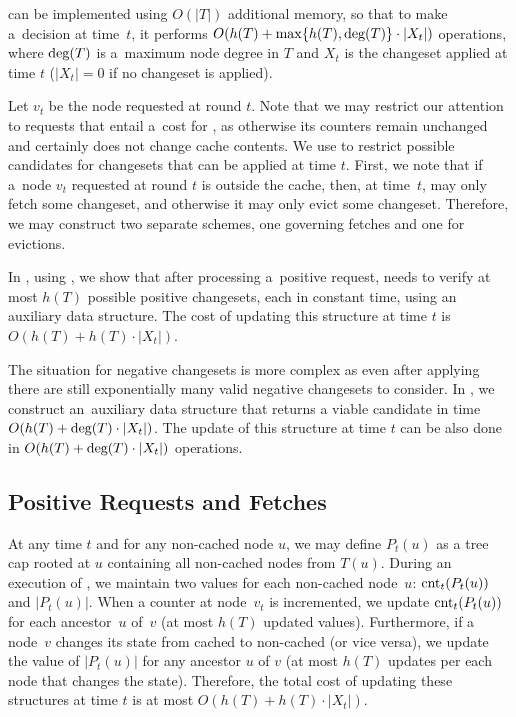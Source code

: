 \begin{theorem}
\ALGTC can be implemented using $O(|T|)$ additional memory, so that to make a~decision at time~$t$, it performs $O(h(T) + \max \{ h(T), \textrm{deg}(T) \} \cdot |X_t|)$ operations,
where $\textrm{deg}(T)$ is a~maximum node degree in $T$ and 
$X_t$ is the changeset applied at time $t$ ($|X_t| = 0$ if no changeset is
applied). 
\end{theorem}


Let $v_t$ be the node requested at round $t$. Note that we may restrict our
attention to requests that entail a~cost for \ALGTC, as otherwise its counters
remain unchanged and certainly \ALGTC does not change cache contents. We use
 to restrict possible candidates
for changesets that can be applied at time $t$. First, we note that if a~node
$v_t$ requested at round $t$ is outside the cache, then, at time~$t$, \ALGTC may
only fetch some changeset, and otherwise it may only evict some changeset.
Therefore, we may construct two separate schemes, one governing fetches and
one for evictions.

In , using 
, we show that after processing 
a~positive request, \ALGTC needs to verify at most $h(T)$ possible positive changesets,
each in constant time, using an auxiliary data
structure. The cost of updating this structure at time $t$ is 
$O(h(T) + h(T) \cdot |X_t|)$.

The situation for negative changesets is more complex as even after applying
 there are still exponentially
many valid negative changesets to consider. In
, we construct an~auxiliary
data structure that returns a viable candidate in time $O(h(T) + \textrm{deg}(T)
\cdot |X_t|)$. The update of this structure at time $t$ can be also done in
$O(h(T) + \textrm{deg}(T) \cdot |X_t|)$ operations.

\subsection{Positive Requests and Fetches}
\label{sec:implementing_positive_counters}

At any time $t$ and for any non-cached node $u$, we may define $P_t(u)$ as a
tree cap rooted at $u$ containing all non-cached nodes from $T(u)$. During an
execution of \ALGTC, we maintain two values for each non-cached node~$u$:
$\textrm{cnt}_t(P_t(u))$ and $|P_t(u)|$. When a counter at node~$v_t$ is incremented, we
update $\textrm{cnt}_t(P_t(u))$ for each ancestor~$u$ of~$v$ (at most $h(T)$ updated
values). Furthermore, if a node~$v$ changes its state from cached to
non-cached (or vice versa), we update the value of $|P_t(u)|$ for any ancestor $u$
of $v$ (at most $h(T)$ updates per each node that changes the
state). Therefore, the total cost of updating these structures at time $t$ is
at most $O(h(T) + h(T) \cdot |X_t|)$.


